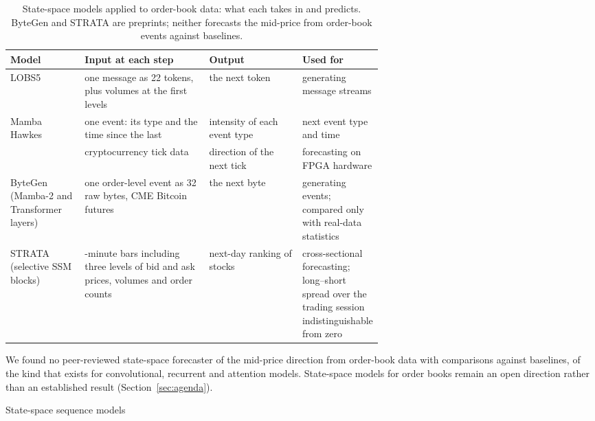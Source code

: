 \begin{table}[!htbp]
\centering\footnotesize
\caption{State-space models applied to order-book data: what each takes in and predicts. ByteGen and STRATA are
preprints; neither forecasts the mid-price from order-book events against baselines.}
\label{tab:ssm-uses}
\setlength{\tabcolsep}{3pt}
\begin{tabularx}{\linewidth}{>{\raggedright\arraybackslash}p{0.2\linewidth}>{\raggedright\arraybackslash}X>{\raggedright\arraybackslash}p{0.25\linewidth}>{\raggedright\arraybackslash}p{0.18\linewidth}}
\toprule
Model & Input at each step & Output & Used for \\
\midrule
LOBS5~\citep{nagy2023} & one message as 22 tokens, plus volumes at the first levels & the next token & generating message streams \\
Mamba Hawkes~\citep{gao2024mhp} & one event: its type and the time since the last & intensity of each event type & next event type and time \\
\citet{popov2026ssm} & cryptocurrency tick data & direction of the next tick & forecasting on FPGA hardware \\
ByteGen~\citep{li2025bytegen} (Mamba-2 and Transformer layers) & one order-level event as 32 raw bytes, CME Bitcoin futures & the next byte & generating events; compared only with real-data statistics \\
STRATA~\citep{chen2026strata} (selective SSM blocks) & 5-minute bars including three levels of bid and ask prices, volumes and order counts & next-day ranking of stocks & cross-sectional forecasting; long--short spread over the trading session indistinguishable from zero \\
\bottomrule
\end{tabularx}
\end{table}

We found no peer-reviewed state-space forecaster of the mid-price direction from order-book data with comparisons
against baselines, of the kind that exists for convolutional, recurrent and attention models. State-space models for
order books remain an open direction rather than an established result (Section~\ref{sec:agenda}).

\begin{modelcard}{State-space sequence models}
\end{modelcard}

